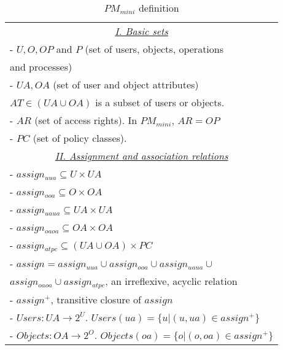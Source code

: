 \newcommand{\pmMini}{PM_{mini}}
\newcommand{\assignment}{assign}
\newcommand{\assignmentPlus}{\assignment^+}
\newcommand{\assignmentStar}{\assignment^*}
\newcommand{\assignmentOOA}{\assignment_{ooa}}
\newcommand{\assignmentUUA}{\assignment_{uua}}
\newcommand{\assignmentOAOA}{\assignment_{oaoa}}
\newcommand{\assignmentUAUA}{\assignment_{uaua}}
\newcommand{\assignmentATPC}{\assignment_{atpc}}
\newcommand{\association}{assoc}
\newcommand{\associationPolicy}{\association_{policy}}
\newcommand{\decisionFunction}{is\_authorized}


\begin{table}
	\centering
	\caption{ $\pmMini$ definition} %
	\label{tab:poilcy-machine-mini}
	\begin{tabular}{|l|}						
		\hline					
		\multicolumn{1}{|c|}{\underline{\textit{I. Basic sets }}}\\				 
		 - $U, O, OP$ and $P$ (set of users, objects, operations \\ \hfill  and processes) \\ 
		 - $UA, OA$ (set of user and object attributes) \\  \hfill $AT \in (UA \cup OA)$ is a subset of  users  or objects.\\
		 - $AR$ (set of access rights).   In $\pmMini$, $AR=OP$ \\
		 - $PC$ (set of policy classes). \\ %
		\multicolumn{1}{|c|}{\underline{\textit{II. Assignment and association relations}}} \\
		
		- $\assignmentUUA \subseteq U \times UA$ \\
		- $\assignmentOOA \subseteq O \times OA$ \\	
 	    - $\assignmentUAUA \subseteq UA \times UA$   \\  
		- $\assignmentOAOA \subseteq OA \times OA$  \\  
		- $\assignmentATPC \subseteq (UA\cup OA) \times PC$\\
		- $\assignment = \assignmentUUA \cup \assignmentOOA \cup \assignmentUAUA \cup$ \\ \hfill   $\assignmentOAOA \cup \assignmentATPC$, an irreflexive, acyclic relation \\
		- $\assignmentPlus$, transitive closure  of $\assignment$   \\
		 - $Users:UA \to 2^U$. $Users(ua) = \{u | (u,ua) \in \assignmentPlus\}$\\
		 - $Objects: OA \to 2^O$. $Objects(oa) = \{ o | (o,oa) \in \assignmentPlus \}$ \\
	 

\end{tabular}
\end{table}

